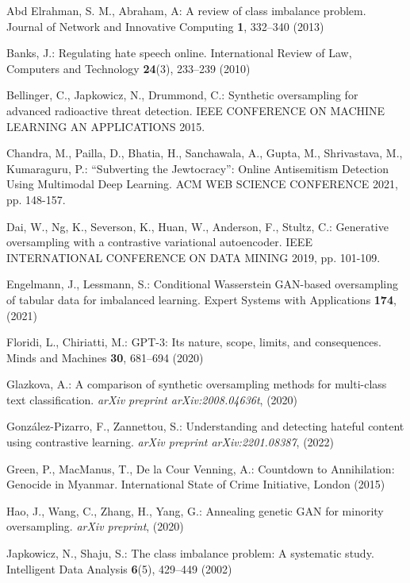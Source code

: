 \documentclass[runningheads]{llncs}
\begin{document}
\begin{thebibliography}{24}
Abd Elrahman, S. M., Abraham, A: A review of class imbalance problem. Journal of Network and Innovative Computing \textbf{1}, 332--340 (2013)

Banks, J.: Regulating hate speech online. International Review of Law, Computers and Technology \textbf{24}(3), 233--239 (2010)

Bellinger, C., Japkowicz, N., Drummond, C.: Synthetic oversampling for advanced radioactive threat detection. IEEE CONFERENCE ON MACHINE LEARNING AN APPLICATIONS 2015.

Chandra, M., Pailla, D., Bhatia, H., Sanchawala, A., Gupta, M., Shrivastava, M., Kumaraguru, P.: ``Subverting the Jewtocracy'': Online Antisemitism Detection Using Multimodal Deep Learning. ACM WEB SCIENCE CONFERENCE 2021, pp. 148-157. 

Dai, W., Ng, K., Severson, K., Huan, W., Anderson, F., Stultz, C.: Generative oversampling with a contrastive variational autoencoder. IEEE INTERNATIONAL CONFERENCE ON DATA MINING 2019, pp. 101-109.

Engelmann, J., Lessmann, S.: Conditional Wasserstein GAN-based oversampling of tabular data for imbalanced learning. Expert Systems with Applications \textbf{174}, (2021)

Floridi, L., Chiriatti, M.: GPT-3: Its nature, scope, limits, and consequences. Minds and Machines \textbf{30}, 681--694 (2020)

Glazkova, A.: A comparison of synthetic oversampling methods for multi-class text classification. \emph{arXiv preprint arXiv:2008.04636t}, (2020)

González-Pizarro, F., Zannettou, S.: Understanding and detecting hateful content using contrastive learning. \emph{arXiv preprint arXiv:2201.08387}, (2022)

Green, P., MacManus, T., De la Cour Venning, A.: Countdown to Annihilation: Genocide in Myanmar. International State of Crime Initiative, London (2015)

Hao, J., Wang, C., Zhang, H., Yang, G.: Annealing genetic GAN for minority oversampling. \emph{arXiv preprint}, (2020)

Japkowicz, N., Shaju, S.: The class imbalance problem: A systematic study. Intelligent Data Analysis \textbf{6}(5), 429--449 (2002)


\end{thebibliography}
\end{document}
